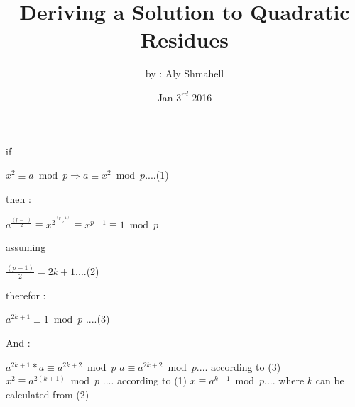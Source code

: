 \documentclass[12pt]{article}
\title{Deriving a Solution to Quadratic Residues}
\author{by : Aly Shmahell}
\date{Jan $ 3^{rd} $ 2016}
\begin{document}
\maketitle
\begin{large}
\begin{center}
if 
\end{center}
$ x^{2} \equiv a \bmod p \Rightarrow a \equiv x^{2} \bmod p $\space\space\space\space....(1) \newline
\begin{center}
then :
\end{center}
 $ a^{\frac{(p-1)}{2}} \equiv x^{2^{\frac{(p-1)}{2}}} \equiv x^{p-1} \equiv 1 \bmod p$ \newline
\begin{center}
assuming 
\end{center}
 $ \frac{(p-1)}{2} = 2k+1 $\space\space\space\space....(2) \newline
\begin{center}
therefor :
\end{center}
 $ a^{2k+1} \equiv 1 \bmod p $ \space\space\space\space....(3) \newline
\begin{center}
And :
\end{center}
$ a^{2k+1} * a \equiv a^{2k+2} \bmod p $ \newline\newline
$ a \equiv a^{2k+2} \bmod p $\space\space\space\space .... according to (3) \newline\newline
$ x^{2} \equiv a^{2(k+1)} \bmod p $ .... according to (1) \newline\newline
$ x \equiv a^{k+1} \bmod p $\space\space\space\space .... where $ k $ can be calculated from (2)
\end{large}
\end{document}

